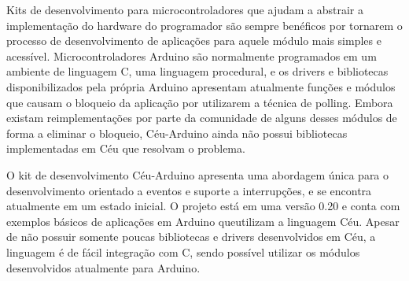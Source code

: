 \documentclass{article}
\begin{document}
\par Kits de desenvolvimento para microcontroladores que ajudam a abstrair a implementação do
hardware do programador são sempre benéficos por tornarem o processo de desenvolvimento de
aplicações para aquele módulo mais simples e acessível. Microcontroladores Arduino são
normalmente programados em um ambiente de linguagem C, uma linguagem procedural, e os drivers
e bibliotecas disponibilizados pela própria Arduino apresentam atualmente funções e módulos que
causam o bloqueio da aplicação por utilizarem a técnica de polling. Embora existam reimplementações
por parte da comunidade de alguns desses módulos de forma a eliminar o bloqueio, Céu-Arduino
ainda não possui bibliotecas implementadas em Céu que resolvam o problema.
\par O kit de desenvolvimento Céu-Arduino apresenta uma abordagem única para o desenvolvimento
orientado a eventos e suporte a interrupções, e se encontra atualmente em um estado inicial. O
projeto está em uma versão 0.20 e conta com exemplos básicos de aplicações em Arduino queutilizam a linguagem Céu. Apesar de não possuir somente poucas bibliotecas e drivers desenvolvidos
em Céu, a linguagem é de fácil integração com C, sendo possível utilizar os módulos desenvolvidos
atualmente para Arduino. \cite{githubceuarduino}
\end{document}

